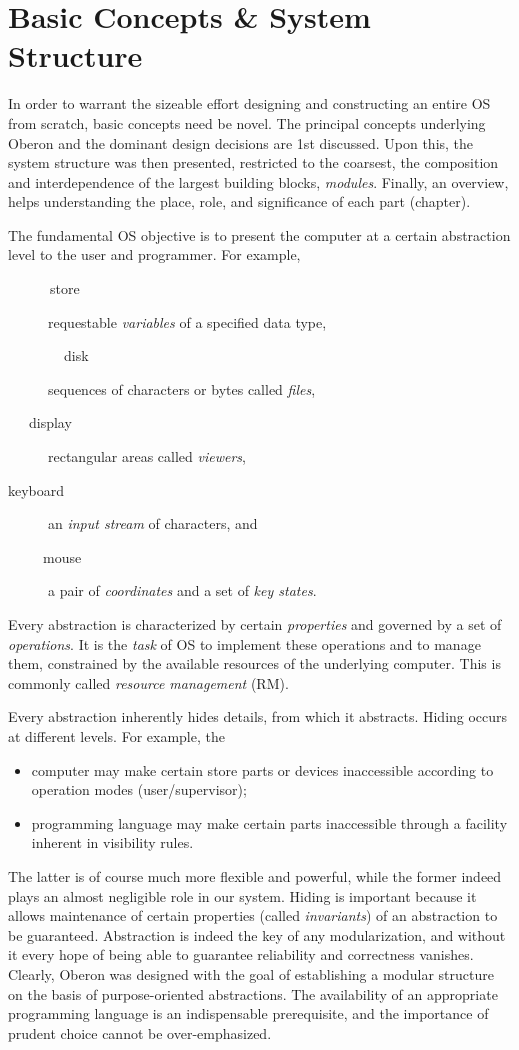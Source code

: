 \chapter{Basic Concepts \& System Structure}
\label{ch:struct}
In order to warrant the sizeable effort designing and constructing an entire OS from scratch,
basic concepts need be novel. The principal concepts underlying Oberon and the dominant
design decisions are 1st discussed. Upon this, the system structure was then presented,
restricted to the coarsest, the composition and interdependence of the largest building
blocks, \emph{modules}. Finally, an overview, helps understanding the place, role, and
significance of each part (chapter).

The fundamental OS objective is to present the computer at a certain abstraction level
to the user and programmer. For example,
\begin{description}
  \item[~~~~~~store] requestable \emph{variables} of a specified data type,
  \item[~~~~~~~~disk] sequences of characters or bytes called \emph{files},
  \item[~~~display] rectangular areas called \emph{viewers},
  \item[keyboard] an \emph{input stream} of characters, and
  \item[~~~~~mouse] a pair of \emph{coordinates} and a set of \emph{key states}.
\end{description}
Every abstraction is characterized by certain \emph{properties} and governed by a set of
\emph{operations}. It is the \emph{task} of OS to implement these operations and to manage
them, constrained by the available resources of the underlying computer. This is commonly
called \emph{resource management} (RM).

Every abstraction inherently hides details, from which it abstracts. Hiding occurs
at different levels. For example, the
\begin{itemize}
  \item computer may make certain store parts or devices inaccessible
    according to operation modes (user/supervisor);
  \item programming language may make certain parts inaccessible through a facility
    inherent in visibility rules.
\end{itemize}
The latter is of course much more flexible and powerful, while the former indeed plays an
almost negligible role in our system. Hiding is important because it allows maintenance
of certain properties (called \emph{invariants}) of an abstraction to be guaranteed.
Abstraction is indeed the key of any modularization, and without it every hope of being
able to guarantee reliability and correctness vanishes. Clearly, Oberon was designed with
the goal of establishing a modular structure on the basis of purpose-oriented abstractions.
The availability of an appropriate programming language is an indispensable prerequisite,
and the importance of prudent choice cannot be over-emphasized.

